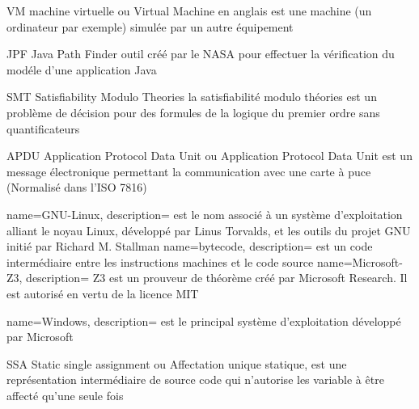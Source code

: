 


    {VM}
    {machine virtuelle}
    { ou Virtual Machine en anglais est une machine (un ordinateur par exemple) simulée par un autre équipement}
    
    {JPF}
    {Java Path Finder}
    { outil créé par le NASA pour effectuer la vérification du modéle d'une application Java}
    
    {SMT}
    {Satisfiability Modulo Theories}
    { la satisfiabilité modulo théories est un problème de décision pour des formules de la logique du premier ordre sans quantificateurs}
    
    {APDU}
    {Application Protocol Data Unit}
    { ou Application Protocol Data Unit est un message électronique permettant la communication avec une carte à puce (Normalisé dans l'ISO 7816)}

{
        name=GNU-Linux,
        description={ est le nom associé à un système d'exploitation alliant le noyau Linux, développé par Linus Torvalds, et les outils du projet GNU initié par Richard M. Stallman}
}
{
	name=bytecode,
	description={ est un code intermédiaire entre les instructions machines et le code source}
}
{
        name=Microsoft-Z3,
        description={ Z3 est un prouveur de théorème créé par Microsoft Research. Il est autorisé en vertu de la licence MIT}
}

{
        name=Windows,
        description={ est le principal système d'exploitation développé par Microsoft}
}


	{SSA}
	{Static single assignment}
	{ ou Affectation unique statique, est une représentation intermédiaire de source code qui n'autorise les variable à être affecté qu'une seule fois}